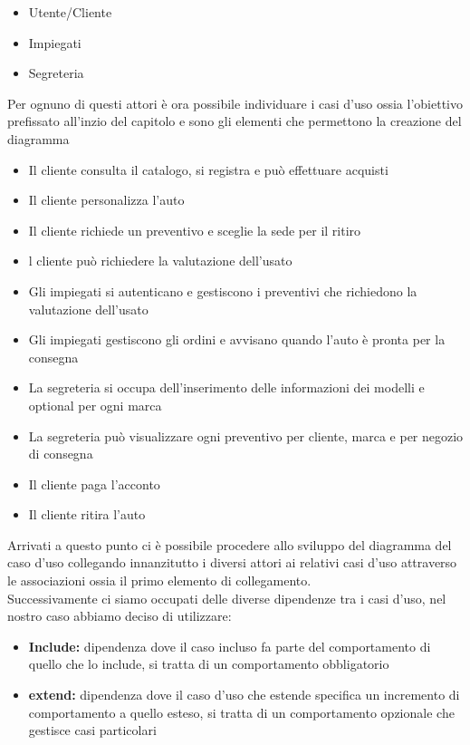 \documentclass[a4paper, 11pt,oneside]{book}
\newcommand{\spacing}{\par\bigskip\noindent}
\begin{document}
        \begin{itemize}
            \item Utente/Cliente
            \item Impiegati
            \item Segreteria
        \end{itemize}
        Per ognuno di questi attori è ora possibile individuare i casi d'uso ossia l'obiettivo prefissato all'inzio del capitolo e sono gli elementi che  permettono la creazione del diagramma
        \begin{itemize}
            \item Il cliente consulta il catalogo, si registra e può effettuare acquisti
            \item Il cliente personalizza l'auto
            \item Il cliente richiede un preventivo e sceglie la sede per il ritiro
            \item l cliente può richiedere la valutazione dell'usato
            \item Gli impiegati si autenticano e gestiscono i preventivi che richiedono la valutazione dell'usato
            \item Gli impiegati  gestiscono gli ordini e avvisano quando l'auto è pronta per la consegna
            \item La segreteria si occupa dell'inserimento delle informazioni dei modelli e optional per ogni marca
            \item La segreteria può visualizzare ogni preventivo per cliente, marca e per negozio di consegna
            \item Il cliente paga l'acconto
            \item Il cliente ritira l'auto
        \end{itemize}
        \spacing
        Arrivati a questo punto ci è possibile procedere allo sviluppo del diagramma del caso d'uso collegando innanzitutto i diversi attori ai relativi casi d'uso attraverso le associazioni ossia il primo elemento di collegamento.\\
        Successivamente ci siamo occupati delle diverse dipendenze tra i casi d'uso, nel nostro caso abbiamo deciso di utilizzare:
        \begin{itemize}
            \item \textbf{Include:} dipendenza dove il caso incluso fa parte del comportamento di quello che lo include, si tratta di un comportamento obbligatorio
            \item \textbf{extend:} dipendenza dove il caso d'uso che estende specifica un incremento di comportamento a quello esteso, si tratta di un comportamento opzionale che gestisce casi particolari
        \end{itemize}
\end{document}
